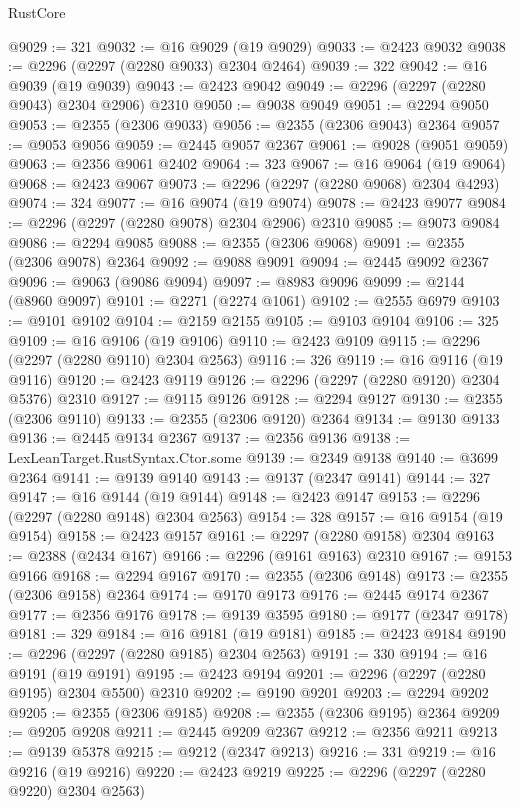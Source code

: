 \begin{lexlean}{RustCore}
\begin{coremodule}
@9029 := 321
@9032 := @16 @9029 (@19 @9029)
@9033 := @2423 @9032
@9038 := @2296 (@2297 (@2280 @9033) @2304 @2464)
@9039 := 322
@9042 := @16 @9039 (@19 @9039)
@9043 := @2423 @9042
@9049 := @2296 (@2297 (@2280 @9043) @2304 @2906) @2310
@9050 := @9038 @9049
@9051 := @2294 @9050
@9053 := @2355 (@2306 @9033)
@9056 := @2355 (@2306 @9043) @2364
@9057 := @9053 @9056
@9059 := @2445 @9057 @2367
@9061 := @9028 (@9051 @9059)
@9063 := @2356 @9061 @2402
@9064 := 323
@9067 := @16 @9064 (@19 @9064)
@9068 := @2423 @9067
@9073 := @2296 (@2297 (@2280 @9068) @2304 @4293)
@9074 := 324
@9077 := @16 @9074 (@19 @9074)
@9078 := @2423 @9077
@9084 := @2296 (@2297 (@2280 @9078) @2304 @2906) @2310
@9085 := @9073 @9084
@9086 := @2294 @9085
@9088 := @2355 (@2306 @9068)
@9091 := @2355 (@2306 @9078) @2364
@9092 := @9088 @9091
@9094 := @2445 @9092 @2367
@9096 := @9063 (@9086 @9094)
@9097 := @8983 @9096
@9099 := @2144 (@8960 @9097)
@9101 := @2271 (@2274 @1061)
@9102 := @2555 @6979
@9103 := @9101 @9102
@9104 := @2159 @2155
@9105 := @9103 @9104
@9106 := 325
@9109 := @16 @9106 (@19 @9106)
@9110 := @2423 @9109
@9115 := @2296 (@2297 (@2280 @9110) @2304 @2563)
@9116 := 326
@9119 := @16 @9116 (@19 @9116)
@9120 := @2423 @9119
@9126 := @2296 (@2297 (@2280 @9120) @2304 @5376) @2310
@9127 := @9115 @9126
@9128 := @2294 @9127
@9130 := @2355 (@2306 @9110)
@9133 := @2355 (@2306 @9120) @2364
@9134 := @9130 @9133
@9136 := @2445 @9134 @2367
@9137 := @2356 @9136
@9138 := LexLeanTarget.RustSyntax.Ctor.some
@9139 := @2349 @9138
@9140 := @3699 @2364
@9141 := @9139 @9140
@9143 := @9137 (@2347 @9141)
@9144 := 327
@9147 := @16 @9144 (@19 @9144)
@9148 := @2423 @9147
@9153 := @2296 (@2297 (@2280 @9148) @2304 @2563)
@9154 := 328
@9157 := @16 @9154 (@19 @9154)
@9158 := @2423 @9157
@9161 := @2297 (@2280 @9158) @2304
@9163 := @2388 (@2434 @167)
@9166 := @2296 (@9161 @9163) @2310
@9167 := @9153 @9166
@9168 := @2294 @9167
@9170 := @2355 (@2306 @9148)
@9173 := @2355 (@2306 @9158) @2364
@9174 := @9170 @9173
@9176 := @2445 @9174 @2367
@9177 := @2356 @9176
@9178 := @9139 @3595
@9180 := @9177 (@2347 @9178)
@9181 := 329
@9184 := @16 @9181 (@19 @9181)
@9185 := @2423 @9184
@9190 := @2296 (@2297 (@2280 @9185) @2304 @2563)
@9191 := 330
@9194 := @16 @9191 (@19 @9191)
@9195 := @2423 @9194
@9201 := @2296 (@2297 (@2280 @9195) @2304 @5500) @2310
@9202 := @9190 @9201
@9203 := @2294 @9202
@9205 := @2355 (@2306 @9185)
@9208 := @2355 (@2306 @9195) @2364
@9209 := @9205 @9208
@9211 := @2445 @9209 @2367
@9212 := @2356 @9211
@9213 := @9139 @5378
@9215 := @9212 (@2347 @9213)
@9216 := 331
@9219 := @16 @9216 (@19 @9216)
@9220 := @2423 @9219
@9225 := @2296 (@2297 (@2280 @9220) @2304 @2563)

\end{coremodule}
\end{lexlean}
